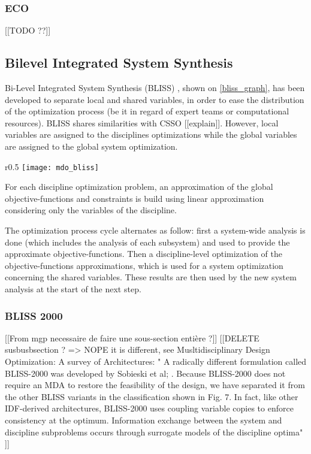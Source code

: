 \subsubsection{ECO}

[[TODO ??]]

\subsection{Bilevel Integrated System Synthesis}

Bi-Level Integrated System Synthesis (BLISS) \cite{J.:1998:BIS:886310}, shown on \figurename{} \ref{bliss_graph}, has been developed to separate local and shared variables, in order to ease the distribution of the optimization process (be it in regard of expert teams or computational resources).
BLISS shares similarities with CSSO [[explain]]. However, local variables are assigned to the disciplines optimizations while the global variables are assigned to the global system optimization.

\begin{wrapfigure}{r}{0.5\textwidth}
\centering
\texttt{[image: mdo\_bliss]}
\caption{BLISS method}\label{bliss_graph}
\end{wrapfigure}

For each discipline optimization problem, an approximation of the global objective-functions and constraints is build using linear approximation considering only the variables of the discipline.

The optimization process cycle alternates as follow: first a system-wide analysis is done (which includes the analysis of each subsystem) and used to provide the approximate objective-functions. Then a discipline-level optimization of the objective-functions approximations, which is used for a system optimization concerning the shared variables. These results are then used by the new system analysis at the start of the next step.

\subsubsection{BLISS 2000}

[[From mgp necessaire de faire une sous-section entière ?]]
[[DELETE susbusbsection ? => NOPE it is different, see Musltidisciplinary Design Optimization: A survey of Architectures:
"    A radically different formulation called BLISS-2000 was developed by Sobieski et al; . Because BLISS-2000
does not require an MDA to restore the feasibility of the design, we have separated it from the other BLISS variants
in the classification shown in Fig. 7. In fact, like other IDF-derived architectures, BLISS-2000 uses coupling variable
copies to enforce consistency at the optimum. Information exchange between the system and discipline subproblems
occurs through surrogate models of the discipline optima"
]]
   
